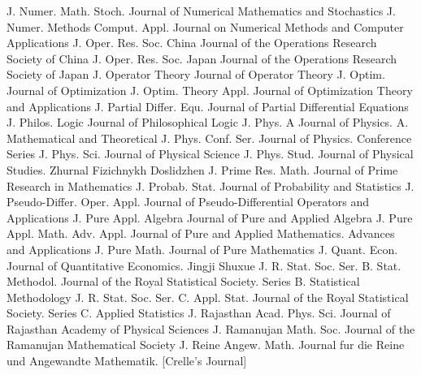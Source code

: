 {J. Numer. Math. Stoch.}
{Journal of Numerical Mathematics and Stochastics}
{J. Numer. Methods Comput. Appl.}
{Journal on Numerical Methods and Computer Applications}
{J. Oper. Res. Soc. China}
{Journal of the Operations Research Society of China}
{J. Oper. Res. Soc. Japan}
{Journal of the Operations Research Society of Japan}
{J. Operator Theory}
{Journal of Operator Theory}
{J. Optim.}
{Journal of Optimization}
{J. Optim. Theory Appl.}
{Journal of Optimization Theory and Applications}
{J. Partial Differ. Equ.}
{Journal of Partial Differential Equations}
{J. Philos. Logic}
{Journal of Philosophical Logic}
{J. Phys. A}
{Journal of Physics. A. Mathematical and Theoretical}
{J. Phys. Conf. Ser.}
{Journal of Physics. Conference Series}
{J. Phys. Sci.}
{Journal of Physical Science}
{J. Phys. Stud.}
{Journal of Physical Studies. Zhurnal Fizichnykh Doslidzhen}
{J. Prime Res. Math.}
{Journal of Prime Research in Mathematics}
{J. Probab. Stat.}
{Journal of Probability and Statistics}
{J. Pseudo-Differ. Oper. Appl.}
{Journal of Pseudo-Differential Operators and Applications}
{J. Pure Appl. Algebra}
{Journal of Pure and Applied Algebra}
{J. Pure Appl. Math. Adv. Appl.}
{Journal of Pure and Applied Mathematics. Advances and Applications}
{J. Pure Math.}
{Journal of Pure Mathematics}
{J. Quant. Econ.}
{Journal of Quantitative Economics. Jingji Shuxue}
{J. R. Stat. Soc. Ser. B. Stat. Methodol.}
{Journal of the Royal Statistical Society. Series B. Statistical Methodology}
{J. R. Stat. Soc. Ser. C. Appl. Stat.}
{Journal of the Royal Statistical Society. Series C. Applied Statistics}
{J. Rajasthan Acad. Phys. Sci.}
{Journal of Rajasthan Academy of Physical Sciences}
{J. Ramanujan Math. Soc.}
{Journal of the Ramanujan Mathematical Society}
{J. Reine Angew. Math.}
{Journal fur die Reine und Angewandte Mathematik. [Crelle's Journal]}
